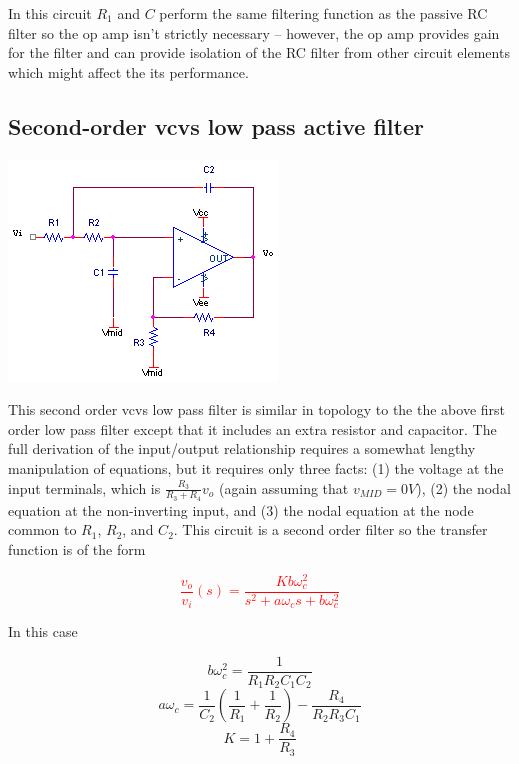 In this circuit $R_1$ and $C$ perform the same filtering function as the passive RC filter so the op amp isn't strictly necessary -- however, the op amp provides gain for the filter and can provide isolation of the RC filter from other circuit elements which might affect the its performance.

\subsection{Second-order \ac{vcvs} low pass active filter}
\begin{center}
	\includegraphics{schematics/2ndorder_vcvs_LPfilter.PNG}
\end{center}
This second order \ac{vcvs} low pass filter is similar in topology to the the above first order low pass filter except that it includes an extra resistor and capacitor. The full derivation of the input/output relationship requires a somewhat lengthy manipulation of equations, but it requires only three facts: (1) the voltage at the input terminals, which is $\frac{R_{3}}{R_{3}+R_{4}}v_{o}$ (again assuming that $v_{MID} = 0V$), (2) the nodal equation at the non-inverting input, and (3) the nodal equation at the node common to $R_{1}$, $R_{2}$, and $C_{2}$. This circuit is a second order filter so the transfer function is of the form

\textcolor{red}{
\begin{equation}
\frac{v_{o}}{v_{i}}(s) = \frac{Kb\omega_{c}^{2}}{s^{2} + a\omega_{c}s + b\omega_{c}^{2}}
\label{eq:2ndorder_vcvs_LPfilter}
\end{equation}
}

In this case

\begin{equation}
b\omega_{c}^{2} = \frac{1}{R_{1}R_{2}C_{1}C_{2}}
\end{equation}
\begin{equation}
a\omega_{c} = \frac{1}{C_{2}}\left(\frac{1}{R_{1}} + \frac{1}{R_{2}}\right) - \frac{R_{4}}{R_{2}R_{3}C_{1}}
\end{equation}
\begin{equation}
K = 1 + \frac{R_{4}}{R_{3}}
\end{equation}

